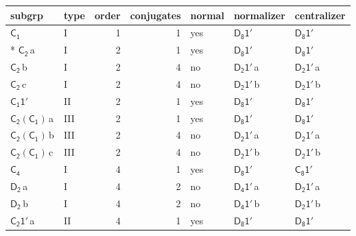 \documentclass[10pt,a4paper]{article}
\numberwithin{equation}{section}
\newcommand{\grp}[1]{\mathsf{#1}}
\newcommand{\clsletter}[1]{\,{\scriptsize\color{black!55}#1}}
\begin{document}
{\small\begin{longtable}{@{}llrrlll@{}}\toprule
subgrp & type & order & conjugates & normal & normalizer & centralizer\\\midrule\endhead
\bottomrule\endfoot\endlastfoot
\href{../../../rotation/data/pdf/C1.pdf}{$\grp{C_{1}}$} & I & 1 & 1 & yes & \href{D8-1p.pdf}{$\grp{D_{8}1'}$} & \href{D8-1p.pdf}{$\grp{D_{8}1'}$}\\*
\href{../../../rotation/data/pdf/C2.pdf}{$\grp{C_{2}}$}\clsletter{a} & I & 2 & 1 & yes & \href{D8-1p.pdf}{$\grp{D_{8}1'}$} & \href{D8-1p.pdf}{$\grp{D_{8}1'}$}\\
\href{../../../rotation/data/pdf/C2.pdf}{$\grp{C_{2}}$}\clsletter{b} & I & 2 & 4 & no & \href{D2-1p.pdf}{$\grp{D_{2}1'}$}\clsletter{a} & \href{D2-1p.pdf}{$\grp{D_{2}1'}$}\clsletter{a}\\
\href{../../../rotation/data/pdf/C2.pdf}{$\grp{C_{2}}$}\clsletter{c} & I & 2 & 4 & no & \href{D2-1p.pdf}{$\grp{D_{2}1'}$}\clsletter{b} & \href{D2-1p.pdf}{$\grp{D_{2}1'}$}\clsletter{b}\\
\href{C1-1p.pdf}{$\grp{C_{1}1'}$} & II & 2 & 1 & yes & \href{D8-1p.pdf}{$\grp{D_{8}1'}$} & \href{D8-1p.pdf}{$\grp{D_{8}1'}$}\\
\href{C2-C1.pdf}{$\grp{C_{2}}(\grp{C_{1}})$}\clsletter{a} & III & 2 & 1 & yes & \href{D8-1p.pdf}{$\grp{D_{8}1'}$} & \href{D8-1p.pdf}{$\grp{D_{8}1'}$}\\
\href{C2-C1.pdf}{$\grp{C_{2}}(\grp{C_{1}})$}\clsletter{b} & III & 2 & 4 & no & \href{D2-1p.pdf}{$\grp{D_{2}1'}$}\clsletter{a} & \href{D2-1p.pdf}{$\grp{D_{2}1'}$}\clsletter{a}\\
\href{C2-C1.pdf}{$\grp{C_{2}}(\grp{C_{1}})$}\clsletter{c} & III & 2 & 4 & no & \href{D2-1p.pdf}{$\grp{D_{2}1'}$}\clsletter{b} & \href{D2-1p.pdf}{$\grp{D_{2}1'}$}\clsletter{b}\\
\href{../../../rotation/data/pdf/C4.pdf}{$\grp{C_{4}}$} & I & 4 & 1 & yes & \href{D8-1p.pdf}{$\grp{D_{8}1'}$} & \href{C8-1p.pdf}{$\grp{C_{8}1'}$}\\
\href{../../../rotation/data/pdf/D2.pdf}{$\grp{D_{2}}$}\clsletter{a} & I & 4 & 2 & no & \href{D4-1p.pdf}{$\grp{D_{4}1'}$}\clsletter{a} & \href{D2-1p.pdf}{$\grp{D_{2}1'}$}\clsletter{a}\\
\href{../../../rotation/data/pdf/D2.pdf}{$\grp{D_{2}}$}\clsletter{b} & I & 4 & 2 & no & \href{D4-1p.pdf}{$\grp{D_{4}1'}$}\clsletter{b} & \href{D2-1p.pdf}{$\grp{D_{2}1'}$}\clsletter{b}\\
\href{C2-1p.pdf}{$\grp{C_{2}1'}$}\clsletter{a} & II & 4 & 1 & yes & \href{D8-1p.pdf}{$\grp{D_{8}1'}$} & \href{D8-1p.pdf}{$\grp{D_{8}1'}$}\\

\end{longtable}}
\end{document}
